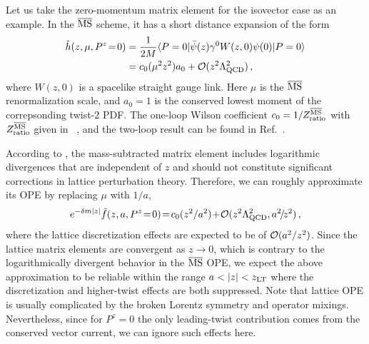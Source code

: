 Let us take the zero-momentum matrix element  for the isovector case as an example. In the ${\overline{\rm MS}}$ scheme, it has a short distance expansion of the form~\cite{Radyushkin:2017lvu,Izubuchi:2018srq}
\begin{align}
			\tilde{h}(z,\mu,P^z\!=\!0)&= {1\over 2M}\langle P=0| \bar{\psi}(z)\gamma^0 W(z,0)\psi(0)|P=0\rangle \nonumber\\
			& = c_0(\mu^2 z^2) a_0 + {\cal O}(z^2\Lambda_{\rm QCD}^2)\,,
\end{align}
where $W(z,0)$ is a spacelike straight gauge link. Here $\mu$ is the ${\overline{\rm MS}}$ renormalization scale, and $a_0=1$ is the conserved lowest moment of the correpsonding twist-2 PDF. The one-loop Wilson coefficient $c_0=1/  Z^{\overline{\rm MS}}_{\rm ratio}$ with $Z^{\overline{\rm MS}}_{\rm ratio}$ given in ~\cite{Izubuchi:2018srq},
and the two-loop result can be found in Ref.~\cite{Li:2020xml}.

According to , the mass-subtracted matrix element includes logarithmic divergences that are independent of $z$ and should not constitute significant corrections in lattice perturbation theory. Therefore, we can roughly approximate its OPE by replacing $\mu$ with $1/a$,
\begin{align}\label{eq:subtracted}
	e^{-\delta m |z|}\tilde{f}(z,a,P^z\!=\!0) \!=\! c_0(z^2/a^2) \!+\! {\cal O}(z^2\Lambda_{\rm QCD}^2, a^2\!/\!z^2)\,,
\end{align}
where the lattice discretization effects are expected to be of ${\cal O}(a^2/z^2)$.
Since the lattice matrix elements are convergent as $z\to0$, which is contrary to the logarithmically divergent behavior in the ${\overline{\rm MS}}$ OPE, we expect the above approximation to be reliable within the range $a < |z| < z_{\rm LT}$ where the discretization and higher-twist effects are both suppressed. Note that lattice OPE is usually complicated by the broken Lorentz symmetry and operator mixings. Nevertheless, since for $P^z=0$ the only leading-twist contribution comes from the conserved vector current, we can ignore such effects here.

